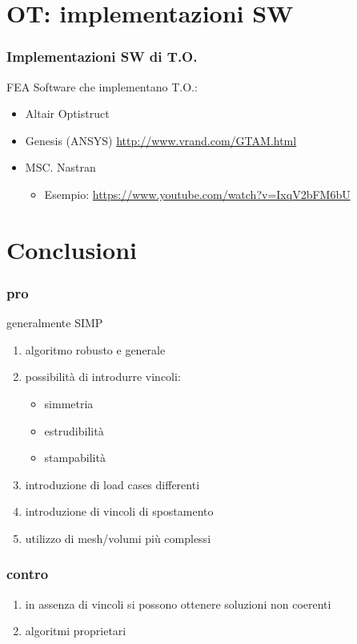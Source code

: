 \documentclass{beamer}
\begin{document}
\section{OT: implementazioni SW}

\begin{frame}
	\frametitle{Implementazioni SW di T.O.}
	
	FEA Software che implementano T.O.:
	\begin{itemize}
		\item Altair Optistruct
		\item Genesis (ANSYS) \url{http://www.vrand.com/GTAM.html}
		\item MSC. Nastran
		\begin{itemize}
			\item Esempio: \url{https://www.youtube.com/watch?v=IxqV2bFM6bU}
		\end{itemize}
	\end{itemize} 
\end{frame}



\section{Conclusioni}

\begin{frame}
	\frametitle{pro}
	generalmente SIMP
	\begin{enumerate}
		\item algoritmo robusto e generale
		\item possibilit\`{a} di introdurre vincoli:
		\begin{itemize}
			\item simmetria
			\item estrudibilit\`{a}
			\item stampabilit\`{a}
		\end{itemize}
		\item introduzione di load cases differenti
		\item introduzione di vincoli di spostamento
		\item utilizzo di mesh/volumi pi\`{u} complessi
	\end{enumerate}
\end{frame}

\begin{frame}
	\frametitle{contro}
	\begin{enumerate}
		\item in assenza di vincoli si possono ottenere soluzioni non coerenti
		\item algoritmi proprietari
	\end{enumerate}
\end{frame}
\end{document}
